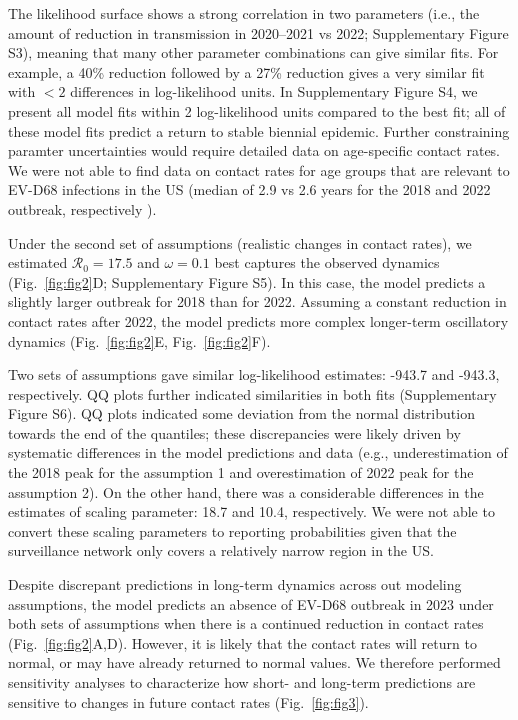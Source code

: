 \documentclass[12pt]{article}
\newcommand{\fref}[1]{Fig.~\ref{fig:#1}}
\begin{document}
The likelihood surface shows a strong correlation in two parameters (i.e., the amount of reduction in transmission in 2020--2021 vs 2022; Supplementary Figure S3), meaning that many other parameter combinations can give similar fits.
For example, a 40\% reduction followed by a 27\% reduction gives a very similar fit with $<2$ differences in log-likelihood units.
In Supplementary Figure S4, we present all model fits within 2 log-likelihood units compared to the best fit;
all of these model fits predict a return to stable biennial epidemic.
Further constraining paramter uncertainties would require detailed data on age-specific contact rates.
We were not able to find data on contact rates for age groups that are relevant to EV-D68 infections in the US (median of 2.9 vs 2.6 years for the 2018 and 2022 outbreak, respectively \citep{shah2021enterovirus,ma2022increase}).

Under the second set of assumptions (realistic changes in contact rates), we estimated $\mathcal R_0 =17.5$ and $\omega = 0.1$ best captures the observed dynamics (\fref{fig2}D; Supplementary Figure S5).
In this case, the model predicts a slightly larger outbreak for 2018 than for 2022.
Assuming a constant reduction in contact rates after 2022, the model predicts more complex longer-term oscillatory dynamics (\fref{fig2}E, \fref{fig2}F).

Two sets of assumptions gave similar log-likelihood estimates: -943.7 and -943.3, respectively.
QQ plots further indicated similarities in both fits (Supplementary Figure S6).
QQ plots indicated some deviation from the normal distribution towards the end of the quantiles;
these discrepancies were likely driven by systematic differences in the model predictions and data (e.g., underestimation of the 2018 peak for the assumption 1 and overestimation of 2022 peak for the assumption 2).
On the other hand, there was a considerable differences in the estimates of scaling parameter: 18.7 and 10.4, respectively.
We were not able to convert these scaling parameters to reporting probabilities given that the surveillance network only covers a relatively narrow region in the US.

Despite discrepant predictions in long-term dynamics across out modeling assumptions, the model predicts an absence of EV-D68 outbreak in 2023 under both sets of assumptions when there is a continued reduction in contact rates (\fref{fig2}A,D).
However, it is likely that the contact rates will return to normal, or may have already returned to normal values.
We therefore performed sensitivity analyses to characterize how short- and long-term predictions are sensitive to changes in future contact rates (\fref{fig3}).
\end{document}
